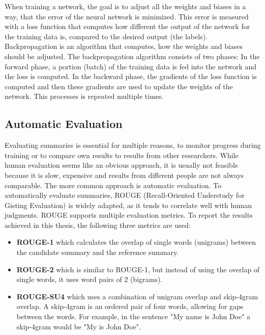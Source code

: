 When training a network, the goal is to adjust all the weights and biases in a way, that the error of the neural network is minimized.
This error is measured with a loss function that computes how different the output of the network for the training data is, compared to the desired output (the labels).
Backpropagation is an algorithm that computes, how the weights and biases should be adjusted.
The backpropagation algorithm consists of two phases: In the forward phase, a portion (batch) of the training data is fed into the network and the loss is computed.
In the backward phase, the gradients of the loss function is computed and then these gradients are used to update the weights of the network.
This processes is repeated multiple times.
\cite[p.~21--24]{Aggarwal2018}


\subsection{Automatic Evaluation}\label{ssec:automatic-evaluation}

Evaluating summaries is essential for multiple reasons, \eg to monitor progress during training or to compare own results to results from other researchers.
While human evaluation seems like an obvious approach, it is usually not feasible because it is slow, expensive and results from different people are not always comparable.
The more common approach is automatic evaluation.
To automatically evaluate summaries, ROUGE (Recall-Oriented Understudy for Gisting Evaluation) \cite{lin-2004-rouge} is widely adapted, as it tends to correlate well with human judgments.
ROUGE supports multiple evaluation metrics.
To report the results achieved in this thesis, the following three metrics are used:
\begin{itemize}
\item \textbf{ROUGE-1} which calculates the overlap of single words (unigrams) between the candidate summary and the reference summary. 
\item \textbf{ROUGE-2} which is similar to ROUGE-1, but instead of using the overlap of single words, it uses word pairs of 2 (bigrams).
\item \textbf{ROUGE-SU4} which uses a combination of unigram overlap and skip-4gram overlap.
A skip-4gram is an ordered pair of four words, allowing for gaps between the words.
For example, in the sentence "My name is John Doe" a skip-4gram would be "My is John Doe".
\end{itemize}

